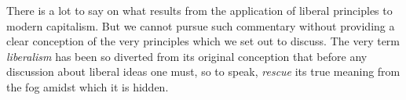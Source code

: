 \documentclass[a4paper]{article}
\begin{document}
There is a lot to say on what results from the application of liberal principles
to modern capitalism. But we cannot pursue such commentary without providing a
clear conception of the very principles which we set out to discuss. The very
term \textit{liberalism} has been so diverted from its original conception that
before any discussion about liberal ideas one must, so to speak, \textit{rescue}
its true meaning from the fog amidst which it is hidden. 



    
\end{document}
